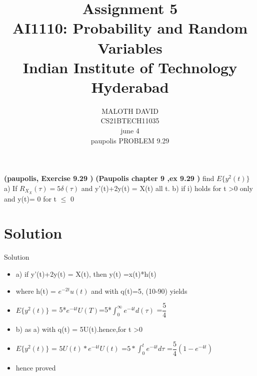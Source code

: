 \documentclass[journal,12pt,twocolumn]{IEEEtran}
\title{Assignment 5 \\ \Large AI1110: Probability and Random Variables \\ \large Indian Institute of Technology Hyderabad}
\author{MALOTH DAVID \\ \normalsize CS21BTECH11035\\ \vspace*{20pt} \normalsize  june 4 \\ \vspace*{20pt} \Large paupolis PROBLEM 9.29}
\begin{document}
	\maketitle
	
	\textbf{(paupolis, Exercise 9.29 )} \textbf{(Paupolis chapter 9 ,ex 9.29 )} find $E\{y^2(t)\}$ a) If  $R_X_X(\tau) =5\delta(\tau)$ and y'(t)+2y(t) = X(t) all t. b) if i) holds for  t \textgreater 0 only and y(t)= 0 for  t $\leq$ 0
	
\section{Solution}
\begin{frame}{Solution}

\begin{itemize}

\item a) if y'(t)+2y(t) = X(t), then y(t) =x(t)*h(t)
\item where h(t) = ${e^{-2t}}u(t)$ and with q(t)=5, (10-90) yields
\item $E\{y^2(t)\}$ = 5*${e^{-4t}}U(T)$=5*$\int_0^\infty{e^{-4t}}d(\tau)$ =$\dfrac{5}{4}$
\item b) as a) with q(t) = 5U(t).hence,for t \textgreater 0
 
\item $E\{y^2(t)\}$ = $5U(t)*{e^{-4t}U(t)}$ =$5*\int_0^t{e^{-4t}d\tau}$ =$ \dfrac{5}{4}(1-{e^{-4t}}) $
\item hence proved
\end{itemize}
    
    
\end{frame} 
\end{document}
